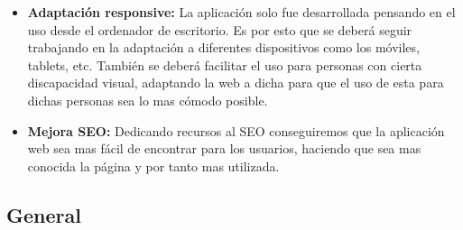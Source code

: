 \begin{itemize}
  \item \textbf{Adaptación responsive:} La aplicación solo fue desarrollada pensando en el
    uso desde el ordenador de escritorio. Es por esto que se deberá seguir trabajando en la
    adaptación a diferentes dispositivos como los móviles, tablets, etc. También se deberá
    facilitar el uso para personas con cierta discapacidad visual, adaptando la web a dicha
    para que el uso de esta para dichas personas sea lo mas cómodo posible.
  \item \textbf{Mejora SEO:} Dedicando recursos al SEO conseguiremos que la aplicación web
    sea mas fácil de encontrar para los usuarios, haciendo que sea mas conocida la página y
    por tanto mas utilizada.
\end{itemize}

\subsection{General}
